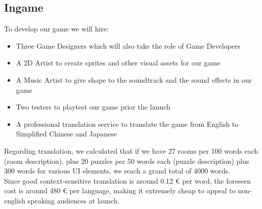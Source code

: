 ﻿\subsection{Ingame}

To develop our game we will hire:

\begin{itemize}
	\item Three Game Designers which will also take the role of Game Developers 
	\item A 2D Artist to create sprites and other visual assets for our game
	\item A Music Artist to give shape to the soundtrack and the sound effects in our game
	\item Two testers to playtest our game prior the launch
	\item A professional translation service to translate the game from English to Simplified Chinese and Japanese
\end{itemize}
Regarding translation, we calculated that if we have 27 rooms per 100 words each (room description), plus 20 puzzles per 50 words each (puzzle description) plus 300 words for various UI elements, we reach a grand total of 4000 words. \\
Since good context-sensitive translation is around 0.12 € per word, the foreseen cost is around 480 € per language, making it extremely cheap to appeal to non-english speaking audiences at launch.\\


\pagebreak